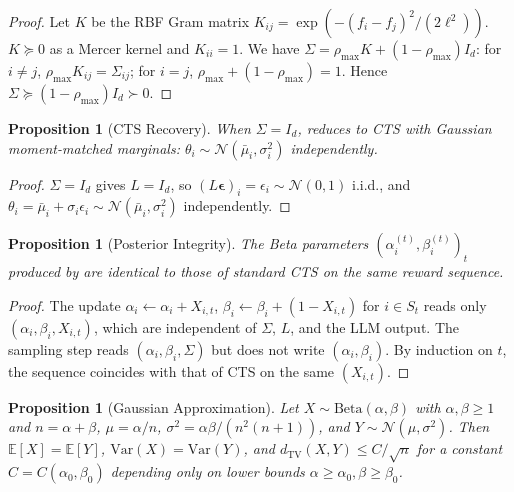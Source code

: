 \documentclass{article}
\theoremstyle{plain}
\newtheorem{proposition}[theorem]{Proposition}
\theoremstyle{definition}
\theoremstyle{remark}
\newcommand{\E}{\mathbb{E}}
\begin{document}
\begin{proof}
Let $K$ be the RBF Gram matrix $K_{ij} = \exp(-(f_i - f_j)^2/(2\ell^2))$.
$K \succeq 0$ as a Mercer kernel and $K_{ii} = 1$.
We have $\Sigma = \rho_{\max} K + (1 - \rho_{\max}) I_d$: for $i \neq j$, $\rho_{\max} K_{ij} = \Sigma_{ij}$; for $i = j$, $\rho_{\max} + (1 - \rho_{\max}) = 1$.
Hence $\Sigma \succeq (1 - \rho_{\max}) I_d \succ 0$.
\end{proof}

\begin{proposition}[CTS Recovery]\label{prop:recovery}
When $\Sigma = I_d$,  reduces to CTS with Gaussian moment-matched marginals: $\theta_i \sim \mathcal{N}(\bar\mu_i, \sigma_i^2)$ independently.
\end{proposition}

\begin{proof}
$\Sigma = I_d$ gives $L = I_d$, so $(L\boldsymbol\epsilon)_i = \epsilon_i \sim \mathcal{N}(0,1)$ i.i.d., and $\theta_i = \bar\mu_i + \sigma_i \epsilon_i \sim \mathcal{N}(\bar\mu_i, \sigma_i^2)$ independently.
\end{proof}

\begin{proposition}[Posterior Integrity]\label{prop:integrity}
The Beta parameters $(\alpha_i^{(t)}, \beta_i^{(t)})_{t}$ produced by  are identical to those of standard CTS on the same reward sequence.
\end{proposition}

\begin{proof}
The update $\alpha_i \leftarrow \alpha_i + X_{i,t}$, $\beta_i \leftarrow \beta_i + (1 - X_{i,t})$ for $i \in S_t$ reads only $(\alpha_i, \beta_i, X_{i,t})$, which are independent of $\Sigma$, $L$, and the LLM output.
The sampling step reads $(\alpha_i, \beta_i, \Sigma)$ but does not write $(\alpha_i, \beta_i)$.
By induction on $t$, the sequence coincides with that of CTS on the same $(X_{i,t})$.
\end{proof}

\begin{proposition}[Gaussian Approximation]\label{prop:gaussian}
Let $X \sim \mathrm{Beta}(\alpha, \beta)$ with $\alpha, \beta \geq 1$ and $n = \alpha + \beta$, $\mu = \alpha/n$, $\sigma^2 = \alpha\beta/(n^2(n+1))$, and $Y \sim \mathcal{N}(\mu, \sigma^2)$.
Then $\E[X] = \E[Y]$, $\mathrm{Var}(X) = \mathrm{Var}(Y)$, and $d_{\mathrm{TV}}(X, Y) \leq C/\sqrt{n}$ for a constant $C = C(\alpha_0, \beta_0)$ depending only on lower bounds $\alpha \geq \alpha_0, \beta \geq \beta_0$.
\end{proposition}
\end{document}
